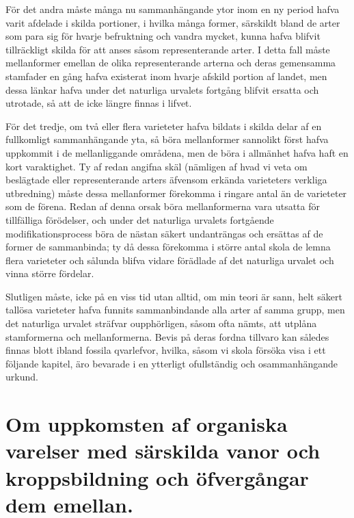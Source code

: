 För det andra måste många nu sammanhängande ytor inom en ny period hafva varit afdelade i skilda portioner, i hvilka många former, särskildt bland de arter som para sig för hvarje befruktning och vandra mycket, kunna hafva blifvit tillräckligt skilda för att anses såsom representerande arter. I detta fall måste mellanformer emellan de olika representerande arterna och deras gemensamma stamfader en gång hafva existerat inom hvarje afskild portion af landet, men dessa länkar hafva under det naturliga urvalets fortgång blifvit ersatta och utrotade, så att de icke längre finnas i lifvet.

För det tredje, om två eller flera varieteter hafva bildats i skilda delar af en fullkomligt sammanhängande yta, så böra mellanformer sannolikt först hafva uppkommit i de mellanliggande områdena, men de böra i allmänhet hafva haft en kort varaktighet. Ty af redan angifna skäl (nämligen af hvad vi veta om beslägtade eller representerande arters äfvensom erkända varieteters verkliga utbredning) måste dessa mellanformer förekomma i ringare antal än de varieteter som de förena. Redan af denna orsak böra mellanformerna vara utsatta för tillfälliga förödelser, och under det naturliga urvalets fortgående modifikationsprocess böra de nästan säkert undanträngas och ersättas af de former de sammanbinda; ty då dessa förekomma i större antal skola de lemna flera varieteter och sålunda blifva vidare förädlade af det naturliga urvalet och vinna större fördelar.

Slutligen måste, icke på en viss tid utan alltid, om min teori är sann, helt säkert tallösa varieteter hafva funnits sammanbindande alla arter af samma grupp, men det naturliga urvalet sträfvar oupphörligen, såsom ofta nämts, att utplåna stamformerna och mellanformerna. Bevis på deras fordna tillvaro kan således finnas blott ibland fossila qvarlefvor, hvilka, såsom vi skola försöka visa i ett följande kapitel, äro bevarade i en ytterligt ofullständig och osammanhängande urkund.

\section[Om uppkomsten av särskilda vanor]{Om uppkomsten af organiska varelser med särskilda
vanor och kroppsbildning och öfvergångar
dem emellan.}

